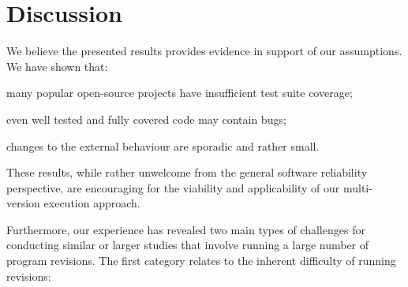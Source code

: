 \section{Discussion}
\label{evolution:discussion}

We believe the presented results provides evidence in support of our
assumptions. We have shown that:%
\begin{inparaenum}[(1)]
\item many popular open-source projects have insufficient test suite coverage;
\item even well tested and fully covered code may contain bugs;
\item changes to the external behaviour are sporadic and rather small.
\end{inparaenum}
These results, while rather unwelcome from the general software reliability
perspective, are encouraging for the viability and applicability of our
multi-version execution approach.


Furthermore, our experience has revealed two main types of challenges for
conducting similar or larger studies that involve running a large number of
program revisions. The first category relates to the inherent difficulty of
running revisions:

